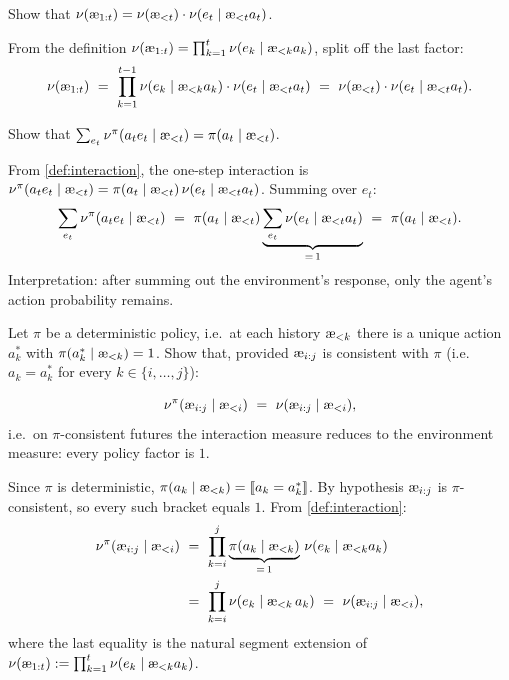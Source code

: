 \documentclass[fontsize=11pt, parskip=half]{scrartcl}
\newcommand{\aes}{\textnormal{\ae}}
\begin{document}
\begin{exercise}
\label{prob:chain_rule}
Show that $\nu(\aes_{1:t}) = \nu(\aes_{<t}) \cdot \nu(e_t \mid \aes_{<t} a_t)$.

\end{exercise}

\begin{solution}
From the definition $\nu(\aes_{1:t}) = \prod_{k=1}^t \nu(e_k \mid \aes_{<k} a_k)$, split off the last factor:
\[
    \nu(\aes_{1:t})
    ~=~ \prod_{k=1}^{t-1} \nu(e_k \mid \aes_{<k} a_k) \cdot \nu(e_t \mid \aes_{<t} a_t)
    ~=~ \nu(\aes_{<t}) \cdot \nu(e_t \mid \aes_{<t} a_t).
\]
\end{solution}

\begin{exercise}
\label{prob:marginal_percepts}
\skippable
Show that $\sum_{e_t} \nu^\pi(a_t e_t \mid \aes_{<t}) = \pi(a_t \mid \aes_{<t})$.

\end{exercise}

\begin{solution}
From \cref{def:interaction}, the one-step interaction is $\nu^\pi(a_t e_t \mid \aes_{<t}) = \pi(a_t \mid \aes_{<t})\, \nu(e_t \mid \aes_{<t} a_t)$. Summing over $e_t$:
\[
    \sum_{e_t} \nu^\pi(a_t e_t \mid \aes_{<t})
    ~=~ \pi(a_t \mid \aes_{<t}) \underbrace{\sum_{e_t} \nu(e_t \mid \aes_{<t} a_t)}_{=\,1}
    ~=~ \pi(a_t \mid \aes_{<t}).
\]
Interpretation: after summing out the environment's response, only the agent's action probability remains.
\end{solution}

\begin{exercise}
\label{prob:det_interaction}
\skippable
Let $\pi$ be a deterministic policy, i.e.\ at each history $\aes_{<k}$ there is a unique action $a^*_k$ with $\pi(a^*_k \mid \aes_{<k}) = 1$.
Show that, provided $\aes_{i:j}$ is consistent with $\pi$ (i.e.\ $a_k = a^*_k$ for every $k \in \{i, \ldots, j\}$):

\[
    \nu^\pi(\aes_{i:j} \mid \aes_{<i}) ~=~ \nu(\aes_{i:j} \mid \aes_{<i}),
\]
i.e.\ on $\pi$-consistent futures the interaction measure reduces to the environment measure: every policy factor is $1$.
\end{exercise}

\begin{solution}
Since $\pi$ is deterministic, $\pi(a_k \mid \aes_{<k}) = \llbracket a_k = a^*_k \rrbracket$.
By hypothesis $\aes_{i:j}$ is $\pi$-consistent, so every such bracket equals $1$.
From \cref{def:interaction}:
\begin{align*}
    \nu^\pi(\aes_{i:j} \mid \aes_{<i})
    ~&=~ \prod_{k=i}^j \underbrace{\pi(a_k \mid \aes_{<k})}_{=\, 1}\, \nu(e_k \mid \aes_{<k} a_k) \\
    ~&=~ \prod_{k=i}^j \nu(e_k \mid \aes_{<k}\, a_k)
    ~=~ \nu(\aes_{i:j} \mid \aes_{<i}),
\end{align*}
where the last equality is the natural segment extension of $\nu(\aes_{1:t}) := \prod_{k=1}^t \nu(e_k \mid \aes_{<k} a_k)$.
\end{solution}
\end{document}

